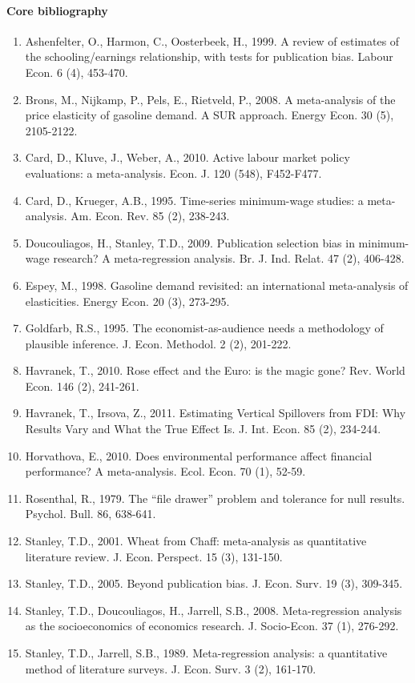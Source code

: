 \paragraph{Core bibliography}


\begin{enumerate}
	\item[]Ashenfelter, O., Harmon, C., Oosterbeek, H., 1999. A review of estimates of the schooling/earnings relationship, with tests for publication bias. Labour Econ. 6 (4), 453-470.
	\item[]Brons, M., Nijkamp, P., Pels, E., Rietveld, P., 2008. A meta-analysis of the price elasticity of gasoline demand. A SUR approach. Energy Econ. 30 (5), 2105-2122.
	\item[]Card, D., Kluve, J., Weber, A., 2010. Active labour market policy evaluations: a meta-analysis. Econ. J. 120 (548), F452-F477.
	\item[]Card, D., Krueger, A.B., 1995. Time-series minimum-wage studies: a meta-analysis. Am. Econ. Rev. 85 (2), 238-243.
	\item[]Doucouliagos, H., Stanley, T.D., 2009. Publication selection bias in minimum-wage research? A meta-regression analysis. Br. J. Ind. Relat. 47 (2), 406-428.
	\item[]Espey, M., 1998. Gasoline demand revisited: an international meta-analysis of elasticities. Energy Econ. 20 (3), 273-295.
	\item[]Goldfarb, R.S., 1995. The economist-as-audience needs a methodology of plausible inference. J. Econ. Methodol. 2 (2), 201-222.
	\item[]Havranek, T., 2010. Rose effect and the Euro: is the magic gone? Rev. World Econ. 146 (2), 241-261.
	\item[]Havranek, T., Irsova, Z., 2011. Estimating Vertical Spillovers from FDI: Why Results Vary and What the True Effect Is. J. Int. Econ. 85 (2), 234-244.
	\item[]Horvathova, E., 2010. Does environmental performance affect financial performance? A meta-analysis. Ecol. Econ. 70 (1), 52-59.
	\item[]Rosenthal, R., 1979. The ``file drawer'' problem and tolerance for null results. Psychol. Bull. 86, 638-641.
	\item[]Stanley, T.D., 2001. Wheat from Chaff: meta-analysis as quantitative literature review. J. Econ. Perspect. 15 (3), 131-150.
	\item[]Stanley, T.D., 2005. Beyond publication bias. J. Econ. Surv. 19 (3), 309-345.
	\item[]Stanley, T.D., Doucouliagos, H., Jarrell, S.B., 2008. Meta-regression analysis as the socioeconomics of economics research. J. Socio-Econ. 37 (1), 276-292.
	\item[]Stanley, T.D., Jarrell, S.B., 1989. Meta-regression analysis: a quantitative method of literature surveys. J. Econ. Surv. 3 (2), 161-170.
\end{enumerate}


